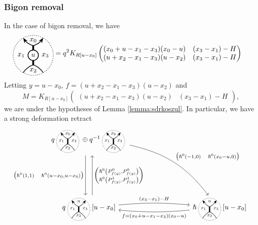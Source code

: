 \documentclass{article}
\theoremstyle{plain} %
\theoremstyle{definition} %
\theoremstyle{remark} %
\begin{document}
\subsubsection{Bigon removal}
In the case of bigon removal, we have
\begin{align*}
\BigonStandard{u} &= q^2K_{R[u-x_0]}
    \begin{pmatrix}
    (x_0+u-x_1-x_3)(x_0-u) & (x_3-x_1)-H\\
    (u+x_2-x_1-x_3)(u-x_2) & (x_3-x_1)-H
    \end{pmatrix}
\end{align*}
Letting $y=u-x_0$, $f=(u+x_2-x_1-x_3)(u-x_2)$ and 
$$
	M=K_{R[u-x_0]}
		\begin{pmatrix}
			(u+x_2-x_1-x_3)(u-x_2) & (x_3-x_1)-H
		\end{pmatrix}
	,
$$ 
we are under the hypotheses of Lemma \ref{lemma:sdrkoszul}. In particular, we have a strong deformation retract
\[
\begin{tikzcd}[column sep=3cm, row sep=2cm]
    q\scalebox{0.7}{\ThickEdgeStandard}\oplus q^{-1}\scalebox{0.7}{\ThickEdgeStandard} 
    \arrow[d, shift right=2, "{\begin{pmatrix} \hslash^0(1,1) \quad \hslash^0(u-x_0,u-x_0)\end{pmatrix}}", swap] 
    \arrow[dr, bend left=20, "{\begin{pmatrix} \hslash^0(-1,0) \quad \hslash^0(x_0-u,0)\end{pmatrix}}"] 
    &
    \\   
    q\scalebox{0.7}{\ThickEdge{u}{x_1}{x_2}{x_3}}[u-x_0] 
    \arrow[u, shift right=2, "{\begin{pmatrix} \hslash^0\left (P^0_{f(y)}, P^0_{f(y)}\right)
    							\\    
    								\hslash^0\left(P^1_{f(y)}, P^1_{f(y)}\right)
    							\end{pmatrix}}"
    	, swap]
	\arrow[r, "(x_3-x_1)-H", bend left=5]& \hslash\scalebox{0.7}{\ThickEdge{u}{x_1}{x_2}{x_3}}[u-x_0] 
	\arrow[l, "f=(x_0+u-x_1-x_3)(x_0-u)", bend left=5]
\end{tikzcd}
\]
\end{document}
